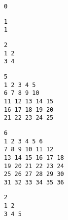 \begin{lstlisting}[title={<rotate0.txt 32>}, label=Listing32]
0
\end{lstlisting}
\begin{lstlisting}[title={<rotate1.txt 33>}, label=Listing33]
1
1
\end{lstlisting}
\begin{lstlisting}[title={<rotate2.txt 34>}, label=Listing34]
2
1 2
3 4
\end{lstlisting}
\begin{lstlisting}[title={<rotate5.txt 35>}, label=Listing35]
5
1 2 3 4 5
6 7 8 9 10
11 12 13 14 15
16 17 18 19 20
21 22 23 24 25
\end{lstlisting}
\begin{lstlisting}[title={<rotate6.txt 36>}, label=Listing36]
6
1 2 3 4 5 6
7 8 9 10 11 12
13 14 15 16 17 18
19 20 21 22 23 24
25 26 27 28 29 30
31 32 33 34 35 36
\end{lstlisting}
\begin{lstlisting}[title={<rotate error.txt 37>}, label=Listing37]
2
1 2
3 4 5
\end{lstlisting}
